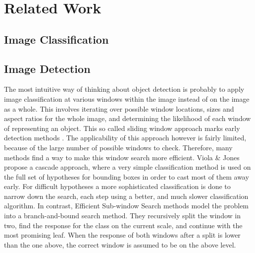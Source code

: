 \section{Related Work} %
\label{cha:related_work}

\subsection{Image Classification} %
\label{sec:image_classification}

\subsection{Image Detection} %
\label{sec:image_detection}



The most intuitive way of thinking about object detection is probably to apply image classification at various windows within the image instead of on the image as a whole. This involves iterating over possible window locations, sizes and aspect ratios for the whole image, and determining the likelihood of each window of representing an object. This so called sliding window approach marks early detection methods \cite{viola2004robust}. The applicability of this approach however is fairly limited, because of the large number of possible windows to check. Therefore, many methods find a way to make this window search more efficient. Viola \& Jones \cite{viola2004robust} propose a cascade approach, where a very simple classification method is used on the full set of hypotheses for bounding boxes in order to cast most of them away early. For difficult hypotheses a more sophisticated classification is done to narrow down the search, each step using a better, and much slower classification algorithm. In contrast, Efficient Sub-window Search methods \cite{behmo2010towards, lampert2008beyond, pedersoli2011coarse, yeh2009fast} model the problem into a branch-and-bound search method. They recursively split the window in two, find the response for the class on the current scale, and continue with the most promising leaf. When the response of both windows after a split is lower than the one above, the correct window is assumed to be on the above level.

